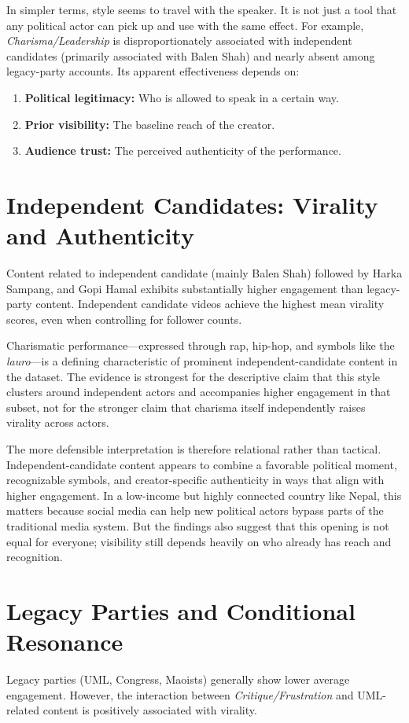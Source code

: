 \documentclass[12pt,a4paper]{report}
\begin{document}
In simpler terms, style seems to travel with the speaker. It is not just a tool that any political actor can pick up and use with the same effect. For example, \textit{Charisma/Leadership} is disproportionately associated with independent candidates (primarily associated with Balen Shah) and nearly absent among legacy-party accounts. Its apparent effectiveness depends on:
\begin{enumerate}
    \item \textbf{Political legitimacy:} Who is allowed to speak in a certain way.
    \item \textbf{Prior visibility:} The baseline reach of the creator.
    \item \textbf{Audience trust:} The perceived authenticity of the performance.
\end{enumerate}

\section{Independent Candidates: Virality and Authenticity}
Content related to independent candidate (mainly Balen Shah) followed by Harka Sampang, and Gopi Hamal exhibits substantially higher engagement than legacy-party content. Independent candidate videos achieve the highest mean virality scores, even when controlling for follower counts.

Charismatic performance—expressed through rap, hip-hop, and symbols like the \textit{lauro}—is a defining characteristic of prominent independent-candidate content in the dataset. The evidence is strongest for the descriptive claim that this style clusters around independent actors and accompanies higher engagement in that subset, not for the stronger claim that charisma itself independently raises virality across actors.

The more defensible interpretation is therefore relational rather than tactical. Independent-candidate content appears to combine a favorable political moment, recognizable symbols, and creator-specific authenticity in ways that align with higher engagement. In a low-income but highly connected country like Nepal, this matters because social media can help new political actors bypass parts of the traditional media system. But the findings also suggest that this opening is not equal for everyone; visibility still depends heavily on who already has reach and recognition.


\section{Legacy Parties and Conditional Resonance}
Legacy parties (UML, Congress, Maoists) generally show lower average engagement. However, the interaction between \textit{Critique/Frustration} and UML-related content is positively associated with virality. 
\end{document}

